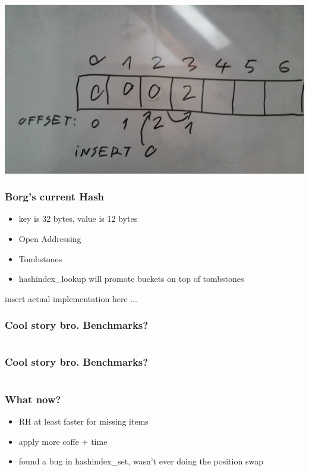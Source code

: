 \documentclass{beamer}
\begin{document}
\begin{frame}
 \begin{center}
 \includegraphics[scale=0.06,keepaspectratio=true]{./images/5.jpg}
 \end{center}
\end{frame}

\begin{frame}
  \frametitle{Borg's current Hash}
  \begin{itemize}
  \item key is 32 bytes, value is 12 bytes
  \item Open Addressing
  \item Tombstones
  \item hashindex\_lookup will promote buckets on top of tombstones
  \end{itemize}
\end{frame}

\begin{frame}
  insert actual implementation here ...
\end{frame}

\begin{frame}
  \frametitle{Cool story bro. Benchmarks?}
  \inputminted[fontsize=\footnotesize]{python}{snippets/bench1.py}
\end{frame}


\begin{frame}
  \frametitle{Cool story bro. Benchmarks?}
   {\fontsize{5.2pt}{5.2pt}
     \inputminted{python}{snippets/bench1.txt}
   }
\end{frame}

\begin{frame}
  \frametitle{What now?}
  \begin{itemize}
  \item RH at least faster for missing items
  \item apply more coffe + time
  \item found a bug in hashindex\_set, wasn't ever doing the position swap
  \end{itemize}
\end{frame}
\end{document}
